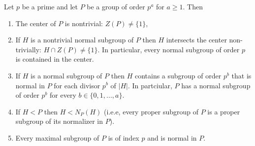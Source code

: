 \begin{thm}
    Let $p$ be a prime and let $P$ be a group of order $p^a$ for $a \geq 1$. Then \begin{enumerate}
        \item The center of $P$ is nontrivial: $Z(P) \neq \{1\}$,
        \item If $H$ is a nontrivial normal subgroup of $P$ then $H$ intersects the center non-trivially: $H \cap Z(P) \neq \{1\}$. In particular, every normal subgroup of order $p$ is contained in the center.
        \item If $H$ is a normal subgroup of $P$ then $H$ contains a subgroup of order $p^b$ that is normal in $P$ for each divisor $p^b$ of $|H|$. In partciular, $P$ has a normal subgroup of order $p^b$ for every $b \in \{0,1,...,a\}$.
        \item If $H < P$ then $H < N_P(H)$ (i.e.e, every proper subgroup of $P$ is a proper subgroup of its normalizer in $P$).
        \item Every maximal subgroup of $P$ is of index $p$ and is normal in $P$.
    \end{enumerate}
\end{thm}
